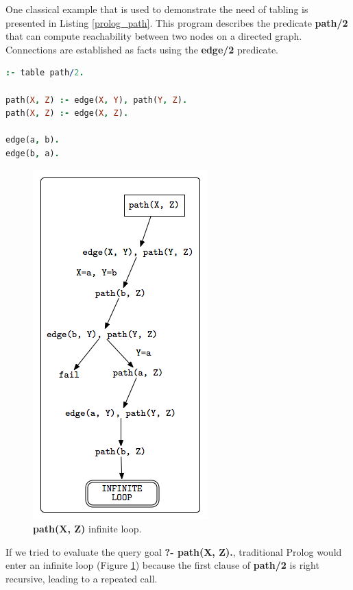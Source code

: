 One classical example that is used to demonstrate the need of tabling is presented in Listing \ref{prolog_path}.
This program describes the predicate \textbf{path/2} that can compute reachability between two nodes on a directed graph.
Connections are established as facts using the \textbf{edge/2} predicate.

\begin{lstlisting}[language=prolog,basicstyle=\footnotesize,float,frame=single,caption={\textit{path} program.},label=prolog_path]
:- table path/2.

path(X, Z) :- edge(X, Y), path(Y, Z).
path(X, Z) :- edge(X, Z).

edge(a, b).
edge(b, a).
\end{lstlisting}

\begin{figure}[ht]
  \centering
    \includegraphics[scale=0.5]{infinite_loop.png}
  \caption{\textbf{path(X, Z)} infinite loop.}
  \label{fig:infinite_loop}
\end{figure}

If we tried to evaluate the query goal \textbf{?- path(X, Z).}, traditional Prolog would enter an infinite loop (Figure \ref{fig:infinite_loop})
because the first clause of \textbf{path/2} is right recursive, leading to a repeated call.

